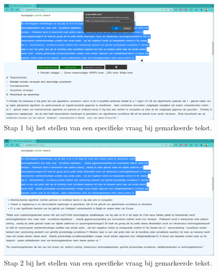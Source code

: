 \begin{center}
	\begin{figure}
		\includegraphics[width=\linewidth]{img/proto-vraagstelling-1.png}
		\caption{Stap 1 bij het stellen van een specifieke vraag bij gemarkeerde tekst.}
		\label{img:step-1-proto-vraagstelling}
	\end{figure}
\end{center}

\begin{center}
	\begin{figure}
		\includegraphics[width=\linewidth]{img/proto-vraagstelling-2.png}
		\caption{Stap 2 bij het stellen van een specifieke vraag bij gemarkeerde tekst.}
		\label{img:step-2-proto-vraagstelling}
	\end{figure}
\end{center}

